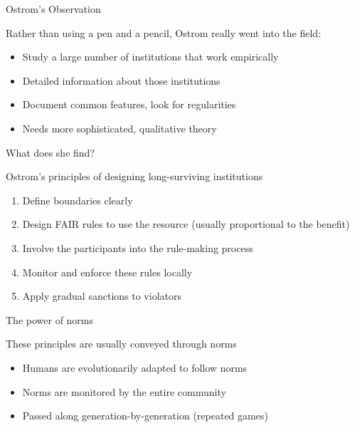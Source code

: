 \begin{frame}{Ostrom's Observation}
\protect\hypertarget{ostroms-observation}{}

Rather than using a pen and a pencil, Ostrom really went into the field:

\begin{itemize}
\tightlist
\item
  Study a large number of institutions that work empirically
\item
  Detailed information about those institutions
\item
  Document common features, look for regularities
\item
  Needs more sophisticated, qualitative theory
\end{itemize}

\end{frame}

\begin{frame}{What does she find?}
\protect\hypertarget{what-does-she-find}{}

Ostrom's principles of designing long-surviving institutions

\begin{enumerate}
\tightlist
\item
  Define boundaries clearly
\item
  Design FAIR rules to use the resource (usually proportional to the
  benefit)
\item
  Involve the participants into the rule-making process
\item
  Monitor and enforce these rules locally
\item
  Apply gradual sanctions to violators
\end{enumerate}

\end{frame}

\begin{frame}{The power of norms}
\protect\hypertarget{the-power-of-norms}{}

These principles are usually conveyed through norms

\begin{itemize}
\tightlist
\item
  Humans are evolutionarily adapted to follow norms
\item
  Norms are monitored by the entire community
\item
  Passed along generation-by-generation (repeated games)
\end{itemize}

\end{frame}

